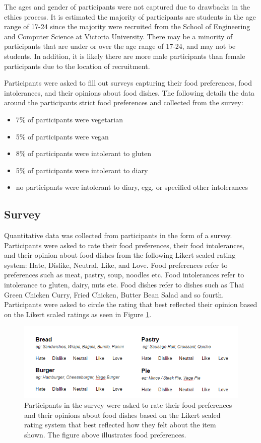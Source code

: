 The ages and gender of participants were not captured due to drawbacks in the ethics process. It is estimated the majority of participants are students in the age range of 17-24 since the majority were recruited from the School of Engineering and Computer Science at Victoria University. There may be a minority of participants that are under or over the age range of 17-24, and may not be students. In addition, it is likely there are more male participants than female participants due to the location of recruitment.

Participants were asked to fill out surveys capturing their food preferences, food intolerances, and their opinions about food dishes. The following details the data around the participants strict food preferences and collected from the survey:
\begin{itemize}
	\item{7\% of participants were vegetarian}
	\item{5\% of participants were vegan}
	\item{8\% of participants were intolerant to gluten}
	\item{5\% of participants were intolerant to diary}
	\item{no participants were intolerant to diary, egg, or specified other intolerances}
\end{itemize}

\subsection{Survey}

Quantitative data was collected from participants in the form of a survey. Participants were asked to rate their food preferences, their food intolerances, and their opinion about food dishes from the following Likert scaled rating system: Hate, Dislike, Neutral, Like, and Love. Food preferences refer to preferences such as meat, pastry, soup, noodles etc. Food intolerances refer to intolerance to gluten, dairy, nuts etc. Food dishes refer to dishes such as Thai Green Chicken Curry, Fried Chicken, Butter Bean Salad and so fourth. Participants were asked to circle the rating that best reflected their opinion based on the Likert scaled ratings as seen in Figure \ref{fig:survey}. 

\begin{figure}
\centering
\includegraphics[scale=1.0]{images/survey_preferences.png}
\caption{Participants in the survey were asked to rate their food preferences and their opinions about food dishes based on the Likert scaled rating system that best reflected how they felt about the item shown. The figure above illustrates food preferences.}
\label{fig:survey}
\end{figure}

